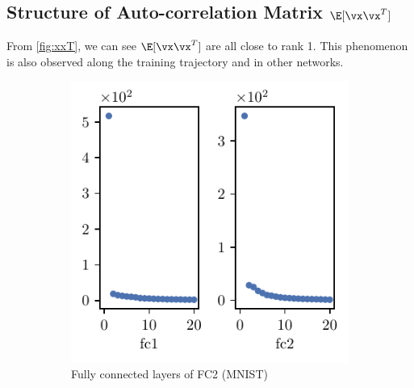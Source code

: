 \subsection{Structure of Auto-correlation Matrix \texorpdfstring{$\E[\vx\vx^T]$}{ExxT}}
\label{sec:xxT}
From \cref{fig:xxT}, we can see $\E[\vx\vx^T]$ are all close to rank 1. This phenomenon is also observed along the training trajectory and in other networks.
\begin{figure}[th]
    \centering
    \begin{subfigure}[b]{0.33\textwidth}
        \centering
        \captionsetup{justification=centering}
        \includegraphics[width=\textwidth]{Figures/Eigenspectrum/xxT/xxT_sigval_d20_MNIST_Exp1_FC2_fixlr0.01R1_E-1_fc1fc2.pdf}
        \caption{Fully connected layers of FC2 (MNIST)}
        \label{fig:xxT_sig_fc2}%
    \end{subfigure}
    \hfill
    \begin{subfigure}[b]{0.33\textwidth}
        \centering
        \captionsetup{justification=centering}

\end{subfigure}
\end{figure}

